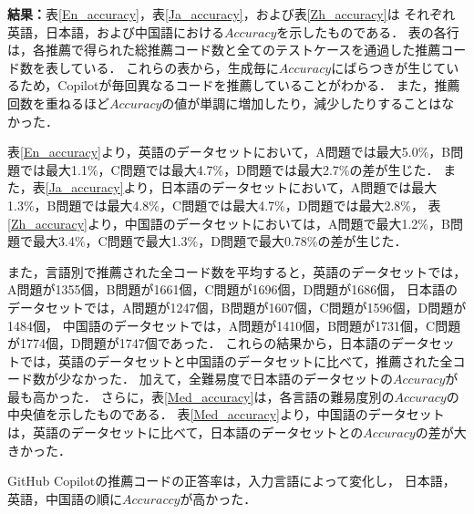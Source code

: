   \noindent\textbf{結果：}表\ref{En_accuracy}，表\ref{Ja_accuracy}，および表\ref{Zh_accuracy}は
  それぞれ英語，日本語，および中国語における$Accuracy$を示したものである．
  表の各行は，各推薦で得られた総推薦コード数と全てのテストケースを通過した推薦コード数を表している．
  これらの表から，生成毎に$Accuracy$にばらつきが生じているため，Copilotが毎回異なるコードを推薦していることがわかる．
  また，推薦回数を重ねるほど$Accuracy$の値が単調に増加したり，減少したりすることはなかった．\par
  
  表\ref{En_accuracy}より，英語のデータセットにおいて，A問題では最大5.0\%，B問題では最大1.1\%，C問題では最大4.7\%，D問題では最大2.7\%の差が生じた．
  また，表\ref{Ja_accuracy}より，日本語のデータセットにおいて，A問題では最大1.3\%，B問題では最大4.8\%，C問題では最大4.7\%，D問題では最大2.8\%，
  表\ref{Zh_accuracy}より，中国語のデータセットにおいては，A問題で最大1.2\%，B問題で最大3.4\%，C問題で最大1.3\%，D問題で最大0.78\%の差が生じた．

  また，言語別で推薦された全コード数を平均すると，英語のデータセットでは，A問題が1355個，B問題が1661個，C問題が1696個，D問題が1686個，
  日本語のデータセットでは，A問題が1247個，B問題が1607個，C問題が1596個，D問題が1484個，
  中国語のデータセットでは，A問題が1410個，B問題が1731個，C問題が1774個，D問題が1747個であった．
  これらの結果から，日本語のデータセットでは，英語のデータセットと中国語のデータセットに比べて，推薦された全コード数が少なかった．
  加えて，全難易度で日本語のデータセットの$Accuracy$が最も高かった．
  さらに，表\ref{Med_accuracy}は，各言語の難易度別の$Accuracy$の中央値を示したものである．   
  表\ref{Med_accuracy}より，中国語のデータセットは，英語のデータセットに比べて，日本語のデータセットとの$Accuracy$の差が大きかった．

  \begin{screen}
    GitHub Copilotの推薦コードの正答率は，入力言語によって変化し，
    日本語，英語，中国語の順に$Accuraccy$が高かった．
  \end{screen}

